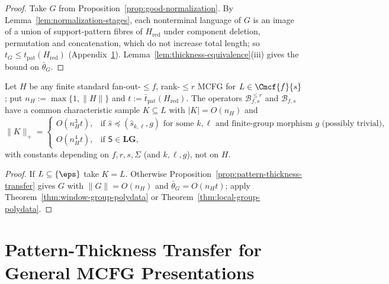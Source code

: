 \begin{proof}
Take $G$ from Proposition~\ref{prop:good-normalization}.  By
Lemma~\ref{lem:normalization-stages}, each nonterminal language of $G$ is an
image of a union of support-pattern fibres of $H_{\mathrm{red}}$ under component
deletion, permutation and concatenation, which do not increase total length;
so $t_G\le t_{\mathrm{pat}}(H_{\mathrm{red}})$
(Appendix~\ref{app:pattern-thickness}).
Lemma~\ref{lem:thickness-equivalence}(iii) gives the bound on $\bar\theta_G$.
\end{proof}

\begin{corollary}
\label{cor:unrestricted-standard-mcfg-data}
Let $H$ be any finite standard fan-out-$\le f$, rank-$\le r$ MCFG for
$L\in\Cmcf{f}{s}$; put $n_H:=\max\{1,\|H\|\}$ and
$t:=\bar t_{\mathrm{pat}}(H_{\mathrm{red}})$.  The operators
$\mathcal B^{\le r}_{f,s}$ and $\mathcal B_{f,s}$ have a common characteristic
sample $K\subseteq L$ with
$|K|=O(n_H)$ and
\[
 \|K\|_+=
 \begin{cases}
 O(n_H^3t),&\text{if }\widehat s\preceq(\widehat s_{k,\ell},g)\text{ for some }k,\ell
 \text{ and finite-group morphism }g\text{ (possibly trivial)},\\
 O(n_H^4t),&\text{if }\mathsf S\in\mathbf{LG},
 \end{cases}
\]
with constants depending on $f,r,s,\Sigma$ (and $k,\ell,g$), not on $H$.
\end{corollary}

\begin{proof}
If $L\subseteq\{\eps\}$ take $K=L$.  Otherwise
Proposition~\ref{prop:pattern-thickness-transfer} gives $G$ with $\|G\|=O(n_H)$ and
$\bar\theta_G=O(n_Ht)$; apply Theorem~\ref{thm:window-group-polydata} or
Theorem~\ref{thm:local-group-polydata}.
\end{proof}

\section{Pattern-Thickness Transfer for General MCFG Presentations}
\label{app:pattern-thickness}

